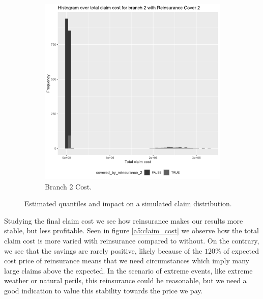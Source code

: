 \documentclass[11pt]{article}
\begin{document}
\begin{figure}[!h]
\begin{subfigure}{.24\textwidth}
    \end{subfigure}
    \begin{subfigure}{.24\textwidth}
      \centering
      \includegraphics[width=.9\linewidth]{plots/reinsurance1/histogram_total_claim_cost_reinsurance2.png}
      \caption{Branch 2 Cost.}
    \end{subfigure}
    \caption{Estimated quantiles and impact on a simulated claim distribution.}
    \label{a5:simulation}
\end{figure}

Studying the final claim cost we see how reinsurance makes our results more stable, but less profitable.
Seen in figure  \ref{a5:claim_cost} we observe how the total claim cost is more varied with reinsurance compared to without.
On the contrary, we see that the savings are rarely positive, likely because of the $120\%$ of expected cost price of reinsurance means that we need circumstances which imply many large claims above the expected.
In the scenario of extreme events, like extreme weather or natural perils, this reinsurance could be reasonable, but we need a good indication to value this stability towards the price we pay.
\end{document}

